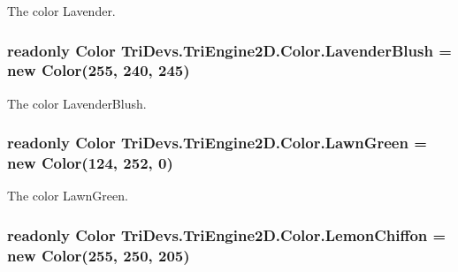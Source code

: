 The color Lavender. 

\hypertarget{struct_tri_devs_1_1_tri_engine2_d_1_1_color_a3cce2e15246bc8bab8dd0996da22210d}{
\subsubsection[{Lavender\-Blush}]{\setlength{\rightskip}{0pt plus 5cm}readonly {\bf Color} Tri\-Devs.\-Tri\-Engine2\-D.\-Color.\-Lavender\-Blush = new {\bf Color}(255, 240, 245)\hspace{0.3cm}{\ttfamily [static]}}}\label{struct_tri_devs_1_1_tri_engine2_d_1_1_color_a3cce2e15246bc8bab8dd0996da22210d}


The color Lavender\-Blush. 

\hypertarget{struct_tri_devs_1_1_tri_engine2_d_1_1_color_a9cdcea195fc07dc028f98582d3591cde}{
\subsubsection[{Lawn\-Green}]{\setlength{\rightskip}{0pt plus 5cm}readonly {\bf Color} Tri\-Devs.\-Tri\-Engine2\-D.\-Color.\-Lawn\-Green = new {\bf Color}(124, 252, 0)\hspace{0.3cm}{\ttfamily [static]}}}\label{struct_tri_devs_1_1_tri_engine2_d_1_1_color_a9cdcea195fc07dc028f98582d3591cde}


The color Lawn\-Green. 

\hypertarget{struct_tri_devs_1_1_tri_engine2_d_1_1_color_aa5ee1fd84bfe6589f1e6316c7ca9315e}{
\subsubsection[{Lemon\-Chiffon}]{\setlength{\rightskip}{0pt plus 5cm}readonly {\bf Color} Tri\-Devs.\-Tri\-Engine2\-D.\-Color.\-Lemon\-Chiffon = new {\bf Color}(255, 250, 205)\hspace{0.3cm}{\ttfamily [static]}}}\label{struct_tri_devs_1_1_tri_engine2_d_1_1_color_aa5ee1fd84bfe6589f1e6316c7ca9315e}


